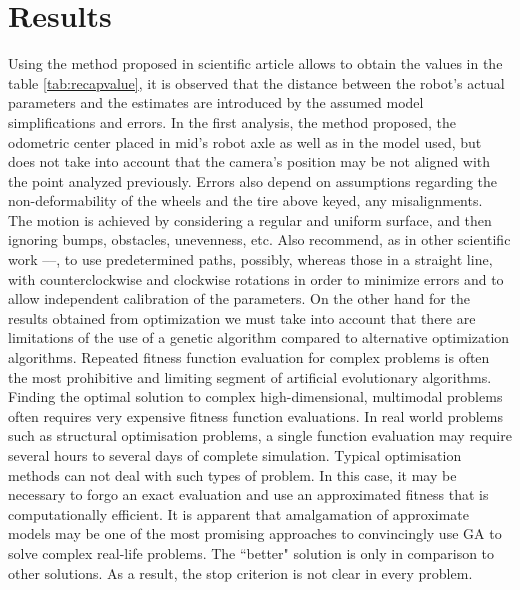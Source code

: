 \section{Results}
Using the method proposed in scientific article \cite{1512356} allows to obtain the values in the table \ref{tab:recapvalue}, it is observed that the distance between the robot’s actual parameters and the estimates are introduced by the assumed model simplifications and errors.
In the first analysis, the method proposed, the odometric center placed in mid’s robot axle as well as in the model used, but does not take into account that the camera’s position may be not aligned with the point analyzed previously.
Errors also depend on assumptions regarding the non-deformability of the wheels and the tire above keyed, any misalignments.\\ 
The motion is achieved by considering a regular and uniform surface, and then ignoring bumps, obstacles, unevenness, etc. 
Also recommend, as in other scientific work \cite{censi13joint}--\cite{Jung2016}--\cite{DBLP:journals/ijrr/ChongK99}, to use predetermined paths, possibly, whereas those in a straight line, with counterclockwise and clockwise rotations in order to minimize errors and to allow independent calibration of the parameters.
On the other hand for the results obtained from optimization we must take into account that there are limitations of the use of a genetic algorithm compared to alternative optimization algorithms.
Repeated fitness function evaluation for complex problems is often the most prohibitive and limiting segment of artificial evolutionary algorithms. Finding the optimal solution to complex high-dimensional, multimodal problems often requires very expensive fitness function evaluations. In real world problems such as structural optimisation problems, a single function evaluation may require several hours to several days of complete simulation. Typical optimisation methods can not deal with such types of problem. In this case, it may be necessary to forgo an exact evaluation and use an approximated fitness that is computationally efficient. It is apparent that amalgamation of approximate models may be one of the most promising approaches to convincingly use GA to solve complex real-life problems.
The ``better" solution is only in comparison to other solutions. As a result, the stop criterion is not clear in every problem.
